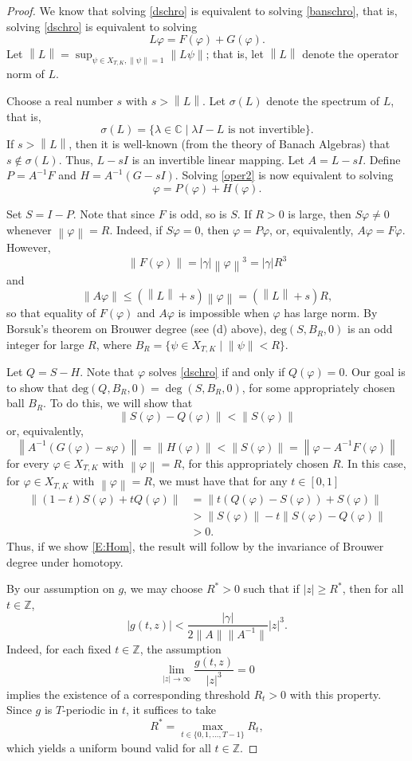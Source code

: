 \documentclass[12 pt,twoside]{amsart}
\newcommand{\ds}{\displaystyle}
\newcommand{\C}{\mathbb{C}}
\newcommand{\norm}[1]{\left \lVert #1 \right \rVert}
\newcommand{\be}{\begin{equation}}
\newcommand{\ee}{\end{equation}}
\newcommand{\bes}{\begin{equation*}}
\newcommand{\ees}{\end{equation*}}
\newcommand{\lam}{\lambda}
\newcommand{\bdeg}{\text{deg}}
\renewcommand{\phi}{\varphi}
\numberwithin{equation}{section}
\theoremstyle{definition}
\theoremstyle{remark}
\begin{document}
\begin{proof}

We know that solving \eqref{dschro} is equivalent to solving \eqref{banschro}, that is, solving \eqref{dschro} is equivalent to solving 
\be\label{oper2}
L\phi=F(\phi)+G(\phi).
\ee
Let $\ds\norm{L}=\sup_{\psi\in X_{T,K}, \norm{\psi}=1}\norm{L\psi}$; that is, let $\norm{L}$ denote the operator norm of $L$.

Choose a real number $s$ with $s>\norm{L}$. Let $\sigma(L)$ denote the spectrum of $L$, that is, 
\bes
\sigma(L)=\{\lam\in \C\mid \lam I-L \text{ is not invertible}\}.
\ees
If $s>\norm{L}$, then it is well-known (from the theory of Banach Algebras) that $s\not\in \sigma(L)$. Thus,  $L-sI$ is an invertible linear mapping.  Let $A=L-sI$. Define {$P=A^{-1}F$} and $H=A^{-1}(G-sI)$. Solving \eqref{oper2} is now equivalent to solving 
\be
\phi=P(\phi)+H(\phi).
\ee

Set $S=I-P$.  Note that since $F$ is odd, so is $S$.  If $R>0$ is large, then $S \phi\neq 0$ whenever $\norm{\phi}=R$.  Indeed, if $S\phi=0$, then {$\phi=P\phi$}, or, equivalently, $A\phi=F\phi$.  However, 
\bes
\norm{F(\phi)}=|\gamma|\norm{\phi}^3=|\gamma|R^3
\ees
 and 
\bes\norm{A\phi}\leq (\norm{L}+s)\norm{\phi}=(\norm{L}+s)R,
\ees
so that equality of $F(\phi)$ and $A\phi$ is impossible when $\phi$ has large norm.
By Borsuk's theorem on Brouwer degree (see (d) above), $\bdeg(S,B_R,0)$ is an odd integer for large $R$, where $B_R=\{\psi\in X_{T,K}\mid \norm{\psi}<R\}$.  

Let $Q=S-H$.  Note that $\phi$ solves \eqref{dschro} if and only if $Q(\phi)=0$.  Our goal is to show that $\bdeg(Q,B_R,0)=\deg(S,B_R,0)$, for some appropriately chosen ball $B_R$.  To do this, we will show that 
\bes
\norm{S(\phi)-Q(\phi)}<\norm{S(\phi)}
\ees
or, equivalently,
\be\label{E:Hom}
\norm{A^{-1}(G(\phi)-s\phi)}=\norm{H(\phi)}<\norm{S(\phi)}=\norm{\phi-A^{-1}F(\phi)}
\ee
for every $\phi\in X_{T,K}$ with $\norm{\phi}=R$, for this appropriately chosen $R$.  In this case, for $\phi\in X_{T,K}$ with $\norm{\phi}=R$, we must have that for any $t\in [0,1]$
\bes
\begin{split}
\norm{(1-t)S(\phi)+tQ(\phi)}&=\norm {t(Q(\phi)-S(\phi))+S(\phi)}\\&>\norm{S(\phi)}-t\norm{S(\phi)-Q(\phi)}\\&>0.
\end{split}
\ees
Thus, if we show \eqref{E:Hom}, the result will follow by the invariance of Brouwer degree under homotopy. 

By our assumption on $g$, we may choose $R^*>0$ such that if $|z|\geq R^*$, then for all $t\in \mathbb{Z}$,
\[
|g(t,z)|<\frac{|\gamma|}{2\|A\|\|A^{-1}\|}|z|^3.
\]
Indeed, for each fixed $t\in\mathbb{Z}$, the assumption
\[
\lim_{|z|\to\infty}\frac{g(t,z)}{|z|^3}=0
\]
implies the existence of a corresponding threshold $R_t>0$ with this property. Since $g$ is $T$-periodic in $t$, it suffices to take
\[
R^*=\max_{t\in\{0,1,\dots,T-1\}} R_t,
\]
which yields a uniform bound valid for all $t\in\mathbb{Z}$. 


\end{proof}
\end{document}
